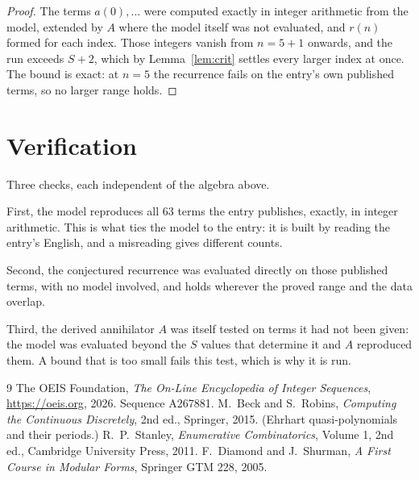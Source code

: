 \documentclass[11pt,a4paper]{article}
\theoremstyle{plain}
\theoremstyle{definition}
\begin{document}
\begin{proof}
The terms $a(0),\dots$ were computed exactly in integer arithmetic from the model, extended by
$A$ where the model itself was not evaluated, and $r(n)$ formed for each index. Those integers
vanish from $n=5+1$ onwards, and the run exceeds $S+2$, which by
Lemma~\ref{lem:crit} settles every larger index at once. The bound is exact: at $n=5$ the recurrence fails on the entry's own published terms, so no larger range holds.
\end{proof}

\section{Verification}

Three checks, each independent of the algebra above.

First, the model reproduces all $63$ terms the entry publishes, exactly, in integer
arithmetic. This is what ties the model to the entry: it is built by reading the entry's
English, and a misreading gives different counts.

Second, the conjectured recurrence was evaluated directly on those published terms, with no
model involved, and holds wherever the proved range and the data overlap.

Third, the derived annihilator $A$ was itself tested on terms it had not been given: the model
was evaluated beyond the $S$ values that determine it and $A$ reproduced them. A bound that is
too small fails this test, which is why it is run.

\begin{thebibliography}{9}
 The OEIS Foundation, \emph{The On-Line Encyclopedia of Integer
Sequences}, \url{https://oeis.org}, 2026. Sequence A267881.
 M.~Beck and S.~Robins, \emph{Computing the Continuous Discretely},
2nd ed., Springer, 2015. (Ehrhart quasi-polynomials and their periods.)
 R.~P.~Stanley, \emph{Enumerative Combinatorics}, Volume 1, 2nd ed.,
Cambridge University Press, 2011.
 F.~Diamond and J.~Shurman, \emph{A First Course in Modular Forms},
Springer GTM 228, 2005.
\end{thebibliography}
\end{document}
